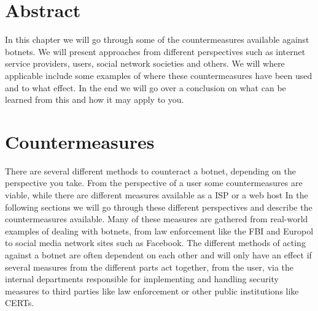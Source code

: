 \section*{Abstract}
In this chapter we will go through some of the countermeasures available against botnets.
We will present approaches from different perspectives such as internet service providers, users, social network societies and others. We will where applicable include some examples of where these countermeasures have been used and to what effect.
In the end we will go over a conclusion on what can be learned from this and how it may apply to you.






\section{Countermeasures}
There are several different methods to counteract a botnet, depending on the perspective you take.
From the perspective of a user some countermeasures are viable, while there are different measures available as a ISP or a web host
In the following sections we will go through these different perspectives and describe the countermeasures available.
Many of these measures are gathered from real-world examples of dealing with botnets, from law enforcement like the FBI and Europol to social media network sites such as Facebook.
The different methods of acting against a botnet are often dependent on each other and will only have an effect if several measures from the different parts act together, from the user, via the internal departments responsible for implementing and handling security measures to third parties like law enforcement or other public institutions like CERTs.

